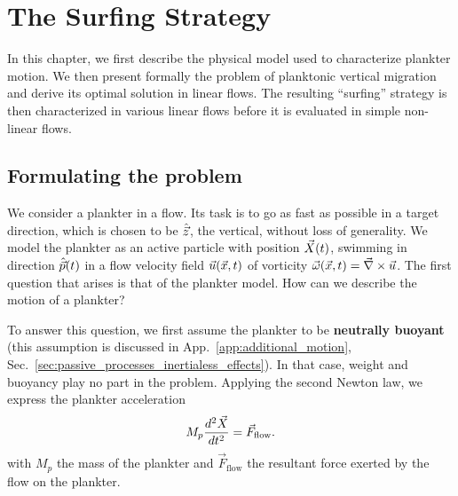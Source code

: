 \chapter{The Surfing Strategy}\label{chap:the_surfing_strategy}

In this chapter, we first describe the physical model used to characterize plankter motion.
We then present formally the problem of planktonic vertical migration and derive its optimal solution in linear flows.
The resulting ``surfing'' strategy is then characterized in various linear flows before it is evaluated in simple non-linear flows.

\section{Formulating the problem}\label{sec:the_surfing_strategy_problem}

We consider a plankter in a flow.
Its task is to go as fast as possible in a target direction, which is chosen to be $\hat{\vec{z}}$, the vertical, without loss of generality.
We model the plankter as an active particle with position $\vec{X} (t)$, swimming in direction $\hat{\vec{p}}(t)$ in a flow velocity field $\vec{u} (\vec{x}, t)$ of vorticity $\vec{\omega} (\vec{x}, t) = \vec{\nabla} \times \vec{u}$.
The first question that arises is that of the plankter model.
How can we describe the motion of a plankter?

To answer this question, we first assume the plankter to be \textbf{neutrally buoyant} (this assumption is discussed in App.~\ref{app:additional_motion}, Sec.~\ref{sec:passive_processes_inertialess_effects}).
In that case, weight and buoyancy play no part in the problem.
Applying the second Newton law, we express the plankter acceleration
\begin{equation}\label{eq:newton_motion}
	M_p \frac{d^2 \vec{X}}{d t^2} = \vec{F}_{\mathrm{flow}}.
\end{equation}
with $M_p$ the mass of the plankter and $\vec{F}_{\mathrm{flow}}$ the resultant force exerted by the flow on the plankter.

